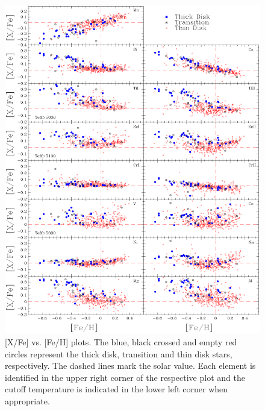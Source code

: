 \documentclass[oldversion]{aa}
\begin{document}
\begin{figure}[t!]
\centering
\includegraphics[trim=0cm 1.3cm 0cm 1.3cm,clip,width=17 cm]{pics/xfefehpaperv3TD.eps}
\caption[abundance gfx]{[X/Fe] vs. [Fe/H] plots. The blue, black crossed and empty red circles represent the thick disk, transition and thin disk stars, respectively. The dashed lines mark the solar value. Each element is identified in the upper right corner of the respective plot and the cutoff temperature is indicated in the lower left corner when appropriate.}
\label{fig:xfefeh1TD}
\end{figure}
\end{document}
